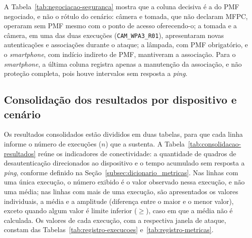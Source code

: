 A Tabela~\ref{tab:negociacao-seguranca} mostra que a coluna decisiva é a do PMF negociado, e não o rótulo do cenário: câmera e tomada, que não declaram MFPC, operaram sem PMF mesmo com o ponto de acesso oferecendo-o; a tomada e a câmera, em uma das duas execuções (\texttt{CAM\_WPA3\_R01}), apresentaram novas autenticações e associações durante o ataque; a lâmpada, com PMF obrigatório, e o \textit{smartphone}, com indício indireto de PMF, mantiveram a associação. Para o \textit{smartphone}, a última coluna registra apenas a manutenção da associação, e não proteção completa, pois houve intervalos sem resposta a \textit{ping}.

\subsection{Consolidação dos resultados por dispositivo e cenário}
\label{subsec:consolidacao_tabelas}

Os resultados consolidados estão divididos em duas tabelas, para que cada linha informe o número de execuções ($n$) que a sustenta. A Tabela~\ref{tab:consolidacao-resultados} reúne os indicadores de conectividade: a quantidade de quadros de desautenticação direcionados ao dispositivo e o tempo acumulado sem resposta a \textit{ping}, conforme definido na Seção~\ref{subsec:dicionario_metricas}. Nas linhas com uma única execução, o número exibido é o valor observado nessa execução, e não uma média; nas linhas com mais de uma execução, são apresentados os valores individuais, a média e a amplitude (diferença entre o maior e o menor valor), exceto quando algum valor é limite inferior ($\geq$), caso em que a média não é calculada. Os valores de cada execução, com a respectiva janela de ataque, constam das Tabelas~\ref{tab:registro-execucoes} e~\ref{tab:registro-metricas}.

